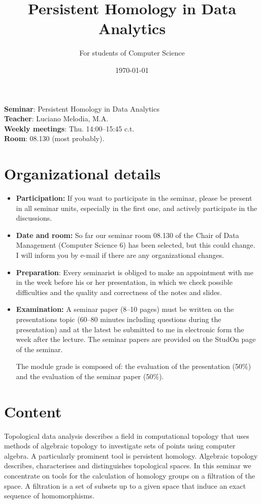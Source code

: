 \documentclass{article}
\title{Persistent Homology in Data Analytics}
\author{For students of Computer Science}
\date{\today}
\begin{document}
\maketitle
\textbf{Seminar}: Persistent Homology in Data Analytics \\
\textbf{Teacher}: Luciano Melodia, M.A.\\[0.2cm]

\textbf{Weekly meetings}: Thu. 14:00--15:45 c.t.\\
\textbf{Room}: 08.130 (most probably).

\section{Organizational details}
\begin{itemize}
    \item \textbf{Participation:} If you want to participate in the seminar, please be present in all seminar units, especially in the first one, and actively participate in the discussions.
    \item \textbf{Date and room:} So far our seminar room 08.130 of the Chair of Data Management (Computer Science 6) has been selected, but this could change. I will inform you by e-mail if there are any organizational changes.
    \item \textbf{Preparation}: Every seminarist is obliged to make an appointment with me in the week before his or her presentation, in which we check possible difficulties and the quality and correctness of the notes and slides.
    \item \textbf{Examination:} A seminar paper (8--10 pages) must be written on the presentations topic (60--80 minutes including questions during the presentation) and at the latest
    be submitted to me in electronic form the week after the lecture. The seminar papers are provided on the StudOn page of the seminar.

    The module grade is composed of: the evaluation of the presentation (50\%) and the evaluation of the seminar paper (50\%).
\end{itemize}

\section{Content}
Topological data analysis describes a field in computational topology that uses methods of algebraic topology to investigate sets of points using computer algebra. A particularly prominent tool is persistent homology.
Algebraic topology describes, characterises and distinguishes topological spaces. In this seminar we concentrate on tools for the calculation of homology groups on a filtration of the space. A filtration is a set of subsets up to a given space that induce an exact sequence of homomorphisms.
\end{document}
